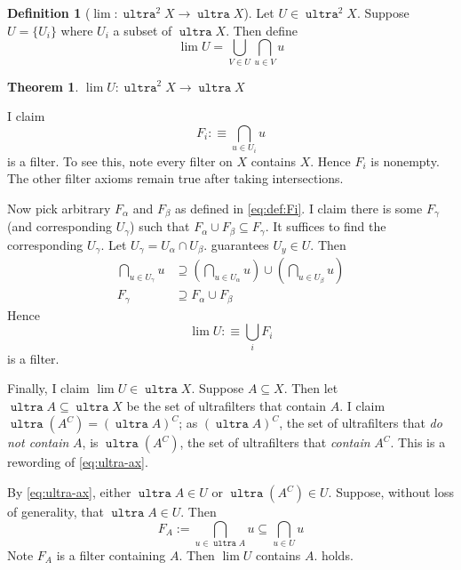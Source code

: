 \documentclass[10pt]{scrartcl}
\makeatletter
\newcommand{\proofname}{Proof.}
\newcounter{proof}\newcounter{currproofctr}\newcounter{endproofctr}%
\newenvironment{proof}[1][\proofname]{
  \th@nonumberplain
  \def\theorem@headerfont{\ttfamily}%
  \normalfont
  \@thm{proof}{proof}{#1}}%
  {\@endtheorem}
\newcounter{thms}
\numberwithin{thms}{section}
\theoremstyle{definition}
\newtheorem{defn}[thms]{Definition}
\newtheorem{theorem}[thms]{Theorem}
\newcommand{\define}{:\equiv}
\renewcommand{\lim}{\operatorname{lim}}
\newcommand{\ultra}{\operatorname{\mathtt{ultra}}}
\makeatother
\begin{document}
\begin{defn}[$\lim: \ultra^2 X \to \ultra X$]
  Let $U\in \ultra^2 X$. Suppose $U=\{U_i\}$ where $U_i$ a subset of $\ultra X$. 
  Then define  
  \begin{equation}
    \lim U = \bigcup_{V\in U}\bigcap_{u\in V} u
    \label{eq:def:lim}
  \end{equation}
\end{defn}

\begin{theorem}
  $\lim U:\ultra^2 X \to \ultra X$
\end{theorem}

\begin{proof}
  I claim 
  \begin{equation}
    \label{eq:def:Fi}
    F_i\define\bigcap_{u \in U_i} u
  \end{equation}
  is a filter. To see this, note every filter on $X$ contains $X$. Hence $F_i$ is nonempty. The other filter axioms remain true after taking intersections. 
  
  Now pick arbitrary $F_\alpha$ and $F_\beta$ as defined in \cref{eq:def:Fi}. I claim there is some $F_\gamma$ (and corresponding $U_\gamma$) such that $F_\alpha \cup F_\beta\subseteq F_\gamma$. It suffices to find the corresponding $U_\gamma$. Let $U_\gamma=U_\alpha\cap U_\beta$.  guarantees $U_y\in U$. Then 
  \begin{align*}
  \bigcap_{u\in U_\gamma} u &\supseteq \left(\bigcap_{u\in U_\alpha} u\right) \cup \left(\bigcap_{u\in U_\beta}u\right)\\
    F_\gamma &\supseteq F_\alpha \cup F_\beta
  \end{align*}
  Hence
  \[
  \lim U \define\bigcup_{i} F_i 
  \]
  is a filter. 
  
  Finally, I claim $\lim U\in \ultra X$. Suppose $A\subseteq X$. Then let $\ultra A\subseteq \ultra X$ be the set of ultrafilters that contain $A$. I claim $\ultra (A^C) =(\ultra A)^C$; as $(\ultra A)^C$, the set of ultrafilters that \emph{do not contain} $A$, is $\ultra(A^C)$, the set of ultrafilters that  
\emph{contain} $A^C$. This is a rewording of \cref{eq:ultra-ax}.

By \cref{eq:ultra-ax}, either $\ultra A\in U$ or $\ultra (A^C)\in U$. Suppose, without loss of generality, that $\ultra A\in U$. Then
\[
F_A:=\bigcap _{u \in \ultra A} u \subseteq \bigcap_ {u\in U} u 
\]
Note $F_A$ is a filter containing $A$. Then $\lim U$ contains $A$.  holds. 
\end{proof}
\end{document}
